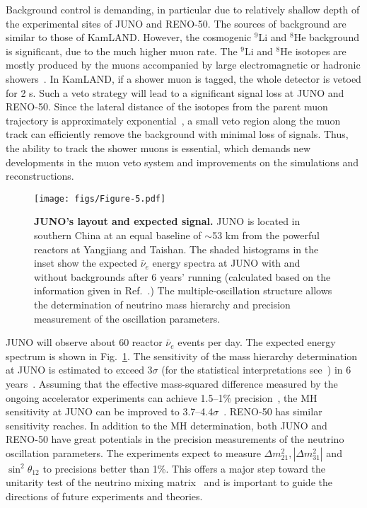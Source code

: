 \documentclass[aps,twocolumn,preprintnumbers,amsmath,superscriptaddress,amssymb,floats,nofootinbib]{revtex4-1}
\begin{document}
Background control is demanding, in particular due to relatively shallow depth of the experimental sites of JUNO and RENO-50.
The sources of background are similar to those of KamLAND.
However, the cosmogenic $^9$Li and $^8$He background is significant, due to the much higher muon rate.
The $^9$Li and $^8$He isotopes are mostly produced by the muons accompanied by large electromagnetic or hadronic showers~\cite{KamLAND-spall}. In KamLAND, if a shower muon is tagged, the whole detector is vetoed for 2 s. Such a veto strategy will lead to a significant signal loss at JUNO and RENO-50.
Since the lateral distance of the isotopes from the parent muon trajectory is approximately exponential~\cite{KamLAND-spall}, a small veto region along the muon track can efficiently remove the background with minimal loss of signals. Thus, the ability to track the shower muons is essential, which demands new developments in the muon veto system and improvements on the simulations and reconstructions.

\begin{figure}[tb]
  \centering
  \texttt{[image: figs/Figure-5.pdf]}
  \caption{{\bf JUNO's layout and expected signal.} JUNO is located in southern China at an equal baseline of $\sim$53 km from the powerful reactors at Yangjiang and Taishan. The shaded histograms in the inset show the expected $\bar\nu_e$ energy spectra at JUNO with and without backgrounds after 6 years' running (calculated based on the information given in Ref.~\cite{He-Now2014}.) The multiple-oscillation structure allows the determination of neutrino mass hierarchy and precision measurement of the oscillation parameters.}
  \label{fig:juno}
\end{figure}

JUNO will observe about 60 reactor $\bar\nu_e$ events per day. The expected energy spectrum is shown in Fig.~\ref{fig:juno}.
The sensitivity of the mass hierarchy determination at JUNO is estimated to exceed 3$\sigma$ (for the statistical interpretations see~\cite{Qian-Stat,Blennow}) in 6 years~\cite{Li-PRD13,MBRwitepaper}.
Assuming that the effective mass-squared difference measured by the ongoing accelerator experiments can achieve 1.5--1\% precision~\cite{Agarwalla}, the MH sensitivity at JUNO can be improved to 3.7--4.4$\sigma$~\cite{Li-PRD13}.
RENO-50 has similar sensitivity reaches.
In addition to the MH determination, both JUNO and RENO-50 have great potentials in the precision measurements of the neutrino oscillation parameters. The experiments expect to measure $\Delta m^2_{21}, |\Delta m^2_{31}|$ and $\sin^2 \theta_{12}$ to precisions better than 1\%. This offers a major step toward the unitarity test of the neutrino mixing matrix~\cite{unitarity13} and is important to guide the directions of future experiments and theories.
\end{document}
